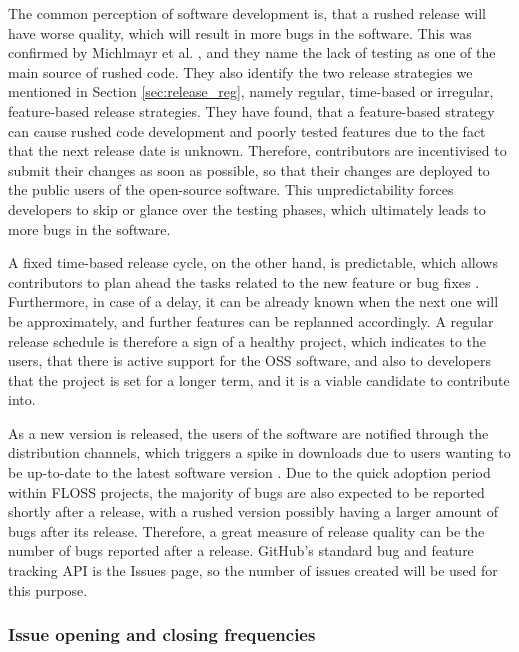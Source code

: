 The common perception of software development is, that a rushed release will have worse quality, which will result in more bugs in the software. This was confirmed by Michlmayr et al. \cite{michlmayrWhyHowShould2015}, and they name the lack of testing as one of the main source of rushed code. They also identify the two release strategies we mentioned in Section \ref{sec:release_reg}, namely regular, time-based or irregular, feature-based release strategies. They have found, that a feature-based strategy can cause rushed code development and poorly tested features due to the fact that the next release date is unknown. Therefore, contributors are incentivised to submit their changes as soon as possible, so that their changes are deployed to the public users of the open-source software. This unpredictability forces developers to skip or glance over the testing phases, which ultimately leads to more bugs in the software.

A fixed time-based release cycle, on the other hand, is predictable, which allows contributors to plan ahead the tasks related to the new feature or bug fixes \cite{michlmayrWhyHowShould2015}. Furthermore, in case of a delay, it can be already known when the next one will be approximately, and further features can be replanned accordingly. A regular release schedule is therefore a sign of a healthy project, which indicates to the users, that there is active support for the OSS software, and also to developers that the project is set for a longer term, and it is a viable candidate to contribute into.

As a new version is released, the users of the software are notified through the distribution channels, which triggers a spike in downloads due to users wanting to be up-to-date to the latest software version \cite{khomhFasterReleasesImprove2012}. Due to the quick adoption period within FLOSS projects, the majority of bugs are also expected to be reported shortly after a release, with a rushed version possibly having a larger amount of bugs after its release. Therefore, a great measure of release quality can be the number of bugs reported after a release. GitHub's standard bug and feature tracking API is the Issues page, so the number of issues created will be used for this purpose. 

\subsubsection{Issue opening and closing frequencies}

